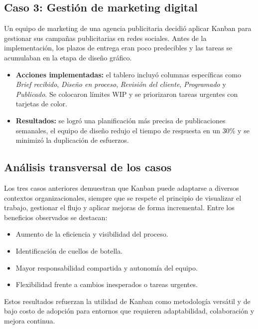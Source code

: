 \subsection{Caso 3: Gestión de marketing digital}

Un equipo de marketing de una agencia publicitaria decidió aplicar Kanban para gestionar sus campañas publicitarias en redes sociales. Antes de la implementación, los plazos de entrega eran poco predecibles y las tareas se acumulaban en la etapa de diseño gráfico.

\begin{itemize}
    \item \textbf{Acciones implementadas:} el tablero incluyó columnas específicas como \textit{Brief recibido}, \textit{Diseño en proceso}, \textit{Revisión del cliente}, \textit{Programado} y \textit{Publicado}. Se colocaron límites WIP y se priorizaron tareas urgentes con tarjetas de color.
    \item \textbf{Resultados:} se logró una planificación más precisa de publicaciones semanales, el equipo de diseño redujo el tiempo de respuesta en un 30\% y se minimizó la duplicación de esfuerzos.
\end{itemize}

\subsection{Análisis transversal de los casos}

Los tres casos anteriores demuestran que Kanban puede adaptarse a diversos contextos organizacionales, siempre que se respete el principio de visualizar el trabajo, gestionar el flujo y aplicar mejoras de forma incremental. Entre los beneficios observados se destacan:

\begin{itemize}
    \item Aumento de la eficiencia y visibilidad del proceso.
    \item Identificación de cuellos de botella.
    \item Mayor responsabilidad compartida y autonomía del equipo.
    \item Flexibilidad frente a cambios inesperados o tareas urgentes.
\end{itemize}

Estos resultados refuerzan la utilidad de Kanban como metodología versátil y de bajo costo de adopción para entornos que requieren adaptabilidad, colaboración y mejora continua.
